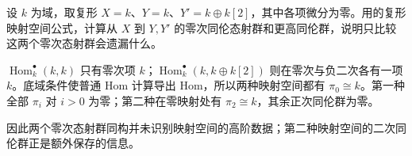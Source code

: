 \begin{exercise}\label{b4:ex:F-higher-mapping-information}
	设 \(k\) 为域，取复形 \(X=k\)、\(Y=k\)、\(Y'=k\oplus k[2]\)，其中各项微分为零。用的复形映射空间公式，计算从 \(X\) 到 \(Y,Y'\) 的零次同伦态射群和更高同伦群，说明只比较这两个零次态射群会遗漏什么。
\end{exercise}
\begin{solution}
	\(\operatorname{Hom}_k^\bullet(k,k)\) 只有零次项 \(k\)；\(\operatorname{Hom}_k^\bullet(k,k\oplus k[2])\) 则在零次与负二次各有一项 \(k\)。底域条件使普通 Hom 计算导出 Hom，所以两种映射空间都有 \(\pi_0\cong k\)。第一种全部 \(\pi_i\) 对 \(i>0\) 为零；第二种在零映射处有 \(\pi_2\cong k\)，其余正次同伦群为零。

	因此两个零次态射群同构并未识别映射空间的高阶数据；第二种映射空间的二次同伦群正是额外保存的信息。
\end{solution}
